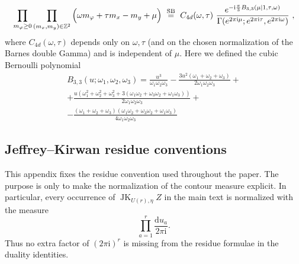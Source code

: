 \documentclass[11pt,a4paper]{article}
\numberwithin{equation}{section}
\theoremstyle{plain}
\theoremstyle{definition}
\theoremstyle{remark}
\newcommand{\ii}{\mathrm{i}}
\newcommand{\dd}{\mathrm{d}}
\begin{document}
\begin{equation}
\prod_{m_\varphi\geq 0}\prod_{(m_x,m_y)\in\mathbb{Z}^2}
\Big(\omega m_\varphi + \tau m_x-m_y+\mu\Big) \ \stackrel{\rm SB}{=}\ C_{4d}(\omega,\tau) \ \frac{e^{-\ii\frac{\pi}{3}B_{3,3}(\mu\mid 1,\tau,\omega)}}{\Gamma(e^{2\pi\ii \mu};e^{2\pi\ii \tau},e^{2\pi\ii \omega})}~,
\end{equation}
where $C_{4d}(\omega,\tau)$ depends only on $\omega,\tau$ (and on the chosen normalization of the Barnes double Gamma) and is independent of $\mu$. Here we defined the cubic Bernoulli polynomial
\begin{multline}
B_{3,3}(u;\omega_1,\omega_2,\omega_3) 
= \frac{u^3}{\omega _1 \omega _2 \omega _3}-\frac{3 u^2 \left(\omega _1+\omega _2+\omega _3\right)}{2 \omega _1 \omega _2 \omega _3}+\\
+\frac{u \left(\omega _1^2+\omega _2^2+\omega _3^2+3 \left(\omega _1 \omega _2+\omega _3 \omega _2+\omega _1 \omega _3\right)\right)}{2 \omega _1 \omega _2 \omega _3}+\\
 - \frac{\left(\omega _1+\omega _2+\omega _3\right) \left(\omega _1 \omega _2+\omega _3 \omega _2+\omega _1 \omega _3\right)}{4 \omega _1 \omega _2 \omega _3}
\end{multline}


\subsection{Jeffrey--Kirwan residue conventions}\label{app:JK-residue-conventions}

This appendix fixes the residue convention used throughout the paper.  The purpose is only to make the normalization of the contour measure explicit.  In particular, every occurrence of
\(
\operatorname{JK}_{U(r),\eta} Z
\)
in the main text is normalized with the measure
\begin{equation}
\prod_{a=1}^{r}\frac{\dd u_a}{2\pi \ii} .
\label{eq:JK-normalized-measure}
\end{equation}
Thus no extra factor of \((2\pi\ii)^r\) is missing from the residue formulae in the duality identities.
\end{document}

